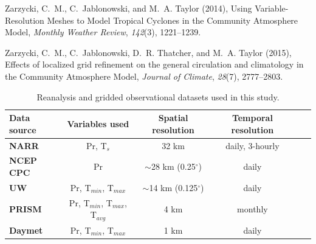 \documentclass[draft,ms]{agutex}   %
\begin{document}
\begin{article}
\begin{thebibliography}{72}
Zarzycki, C.~M., C.~Jablonowski, and M.~A. Taylor (2014{}), {Using
  Variable-Resolution Meshes to Model Tropical Cyclones in the Community
  Atmosphere Model}, \textit{Monthly Weather Review}, \textit{142}(3),
  1221--1239.

Zarzycki, C.~M., C.~Jablonowski, D.~R. Thatcher, and M.~A. Taylor (2015),
  {Effects of localized grid refinement on the general circulation and
  climatology in the Community Atmosphere Model}, \textit{Journal of Climate},
  \textit{28}(7), 2777--2803.

\end{thebibliography}


\end{article}


\clearpage

\begin{table}
\caption{Reanalysis and gridded observational datasets used in this study.} \label{tab:Datasets}
\begin{center}
\begin{tabular}{lccccc} 
\hline \textbf{Data source} & \textbf{Variables used} & \textbf{Spatial resolution} & \textbf{Temporal resolution} \\
\hline \textbf{NARR} & Pr, T$_{s}$ & 32 km & daily, 3-hourly \\
\textbf{NCEP CPC} & Pr & $\sim$28 km (0.25$^\circ$) & daily \\
\textbf{UW} & Pr, T$_{min}$, T$_{max}$ & $\sim$14 km (0.125$^\circ$) & daily \\
\textbf{PRISM} & Pr, T$_{min}$, T$_{max}$, T$_{avg}$ & 4 km & monthly \\
\textbf{Daymet} & Pr, T$_{min}$, T$_{max}$ & 1 km & daily \\
\hline
\end{tabular}
\end{center}
\end{table}

\end{document}
